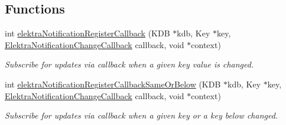 \subsection*{Functions}
\begin{DoxyCompactItemize}
\item 
int \hyperlink{group__kdbnotification_gab42738703162b3769b1336dcade47b18}{elektra\+Notification\+Register\+Callback} (K\+DB $\ast$kdb, Key $\ast$key, \hyperlink{group__kdbnotification_gad0d800e32a72d89780321e5723301eb9}{Elektra\+Notification\+Change\+Callback} callback, void $\ast$context)
\begin{DoxyCompactList}\small\item\em Subscribe for updates via callback when a given key value is changed. \end{DoxyCompactList}\item 
int \hyperlink{group__kdbnotification_ga374edd4f4fff527d6511ce4d0df62681}{elektra\+Notification\+Register\+Callback\+Same\+Or\+Below} (K\+DB $\ast$kdb, Key $\ast$key, \hyperlink{group__kdbnotification_gad0d800e32a72d89780321e5723301eb9}{Elektra\+Notification\+Change\+Callback} callback, void $\ast$context)
\begin{DoxyCompactList}\small\item\em Subscribe for updates via callback when a given key or a key below changed. \end{DoxyCompactList}\end{DoxyCompactItemize}
